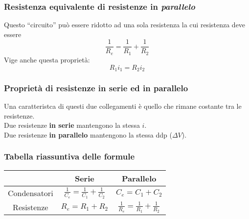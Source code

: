 \subsubsection{Resistenza equivalente di resistenze in \emph{parallelo}}
\begin{center}
\end{center}
Questo ``circuito'' può essere ridotto ad una sola resistenza la cui resistenza deve essere
\begin{equation*}
  \frac{1}{R_e} = \frac{1}{R_1} + \frac{1}{R_2}
\end{equation*}
Vige anche questa proprietà:
\begin{equation*}
  R_1i_1 = R_2i_2
\end{equation*}

\subsubsection{Proprietà di resistenze in serie ed in parallelo}
Una caratteristca di questi due collegamenti è quello che rimane costante tra le 
resistenze.\\[\baselineskip]
Due resistenze \textbf{in serie} mantengono la stessa $i$.\\
Due resistenze \textbf{in parallelo} mantengono la stessa ddp ($\Delta V$).

\subsubsection{Tabella riassuntiva delle formule}

\begin{center}
  \begin{tabular}{c | c | c}
    & Serie & Parallelo \\ \midrule
    Condensatori & $\frac{1}{C_e} = \frac{1}{C_1} + \frac{1}{C_2}$ & $C_e = C_1 + C_2$\\
    Resistenze & $R_e = R_1 + R_2$ & $\frac{1}{R_e} = \frac{1}{R_1} + \frac{1}{R_2}$\\
  \end{tabular}
\end{center}

